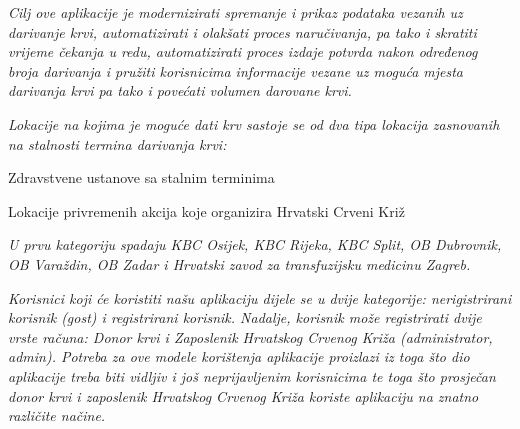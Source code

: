 		\textit{Cilj ove aplikacije je modernizirati spremanje i prikaz podataka vezanih uz darivanje krvi, automatizirati i olakšati proces naručivanja, pa tako i skratiti vrijeme čekanja u redu, automatizirati proces izdaje potvrda nakon određenog broja darivanja i pružiti korisnicima informacije vezane uz moguća mjesta darivanja krvi pa tako i povećati volumen darovane krvi. }

		\textit{Lokacije na kojima je moguće dati krv sastoje se od dva tipa lokacija zasnovanih na stalnosti termina darivanja krvi:}
		\begin{packed_enum}

					\item Zdravstvene ustanove sa stalnim terminima
					\item Lokacije privremenih akcija koje organizira Hrvatski Crveni Križ

		\end{packed_enum}

		\textit{U prvu kategoriju spadaju KBC Osijek, KBC Rijeka, KBC
		Split, OB Dubrovnik, OB Varaždin, OB Zadar i Hrvatski zavod za transfuzijsku medicinu Zagreb. }

		\textit{Korisnici koji će koristiti našu aplikaciju dijele se u dvije kategorije: nerigistrirani korisnik (gost) i registrirani korisnik. Nadalje, korisnik može registrirati dvije vrste računa: Donor krvi i Zaposlenik Hrvatskog Crvenog Križa (administrator, admin). Potreba za ove modele korištenja aplikacije proizlazi iz toga što dio aplikacije treba biti vidljiv i još neprijavljenim korisnicima te toga što prosječan donor krvi i zaposlenik Hrvatskog Crvenog Križa koriste aplikaciju na znatno različite načine.}

